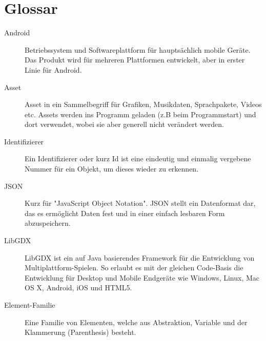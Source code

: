 \section{Glossar}
\begin{description}

\item[Android]
Betriebssystem und Softwareplattform für hauptsächlich mobile Geräte.
Das Produkt wird für mehreren Plattformen entwickelt, aber in erster Linie für Android.

\item[Asset]
Asset in ein Sammelbegriff für Grafiken, Musikdaten, Sprachpakete, Videos etc. 
Assets werden ins Programm geladen (z.B beim Programmstart) und dort verwendet, wobei sie aber generell nicht verändert werden.

\item[Identifizierer]
Ein Identifizierer oder kurz Id ist eine eindeutig und einmalig vergebene Nummer für ein Objekt, um dieses wieder zu erkennen.

\item[JSON]
Kurz für "JavaScript Object Notation". JSON stellt ein Datenformat dar, das es ermöglicht Daten fest und in einer einfach lesbaren Form abzuspeichern.

\item[LibGDX]
LibGDX ist ein auf Java basierendes Framework für die Entwicklung von Multiplattform-Spielen. So erlaubt es mit der gleichen Code-Basis die Entwicklung für Desktop und Mobile Endgeräte wie Windows, Linux, Mac OS X, Android, iOS und HTML5. 

\item[Element-Familie]
Eine Familie von Elementen, welche aus Abstraktion, Variable und der Klammerung (Parenthesis) besteht.

\end{description}